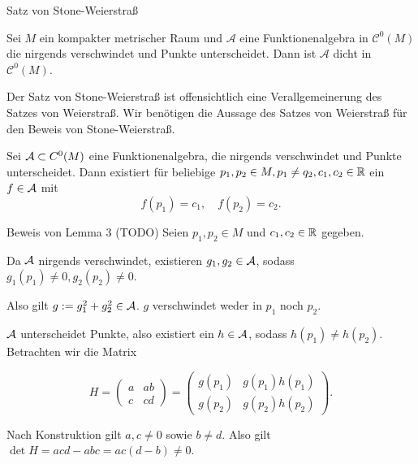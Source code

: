\begin{frame}{Satz von Stone-Weierstraß}
    \begin{satz}
        Sei \(M\) ein kompakter metrischer Raum und \( \mathcal{A} \) eine 
        Funktionenalgebra in \( \mathcal{C}^0(M) \) die nirgends verschwindet und 
        Punkte unterscheidet. 
        Dann ist \( \mathcal{A} \) dicht in \( \mathcal{C}^0(M) \).
    \end{satz}
    \pause
    \begin{bem}
        Der Satz von Stone-Weierstraß ist offensichtlich eine Verallgemeinerung 
        des Satzes von Weierstraß. 
        Wir benötigen die Aussage des Satzes von Weierstraß für den Beweis von Stone-Weierstraß.
    \end{bem}
\end{frame}

\begin{frame}
    \begin{lem}
        Sei \( \mathcal{A} \subset C^0(M) \) eine Funktionenalgebra, die nirgends verschwindet 
        und Punkte unterscheidet. 
        Dann existiert für beliebige \( p_1, p_2 \in M, p_1\neq q_2, 
        c_1, c_2 \in \mathbb{R} \)
        ein \(f \in \mathcal{A}\) mit 
        \[ f(p_1) = c_1, \quad f(p_2) = c_2. \]
    \end{lem}
\end{frame}

\begin{frame}{Beweis von Lemma 3 (TODO)}
    Seien \( p_1, p_2 \in M \) und \( c_1, c_2 \in \mathbb{R} \) gegeben. 
    \pause

    Da \(\mathcal{A}\) nirgends verschwindet, existieren \( g_1, g_2 \in \mathcal{A} \), 
    sodass 
    \( g_1(p_1) \neq 0, g_2(p_2) \neq 0 \). 
    \pause

    Also gilt \( g := g_1^2 + g_2^2 \in \mathcal{A} \). \(g\) verschwindet weder in \(p_1\) noch \(p_2\).
    \pause 

    \(\mathcal{A}\) unterscheidet Punkte, also existiert ein \( h \in \mathcal{A} \), sodass 
    \( h(p_1) \neq h(p_2) \).
    \pause 
    Betrachten wir die Matrix 

    \[ H = \begin{pmatrix}
        a & ab \\
        c & cd
    \end{pmatrix} = \begin{pmatrix}
        g(p_1) & g(p_1) h(p_1) \\
        g(p_2) & g(p_2) h(p_2)
    \end{pmatrix}. \]

    Nach Konstruktion gilt 
    \( a, c \neq 0 \) sowie \(b \neq d\). Also gilt \( \det H = acd - abc = ac(d - b) \neq 0 \). 
\end{frame}

